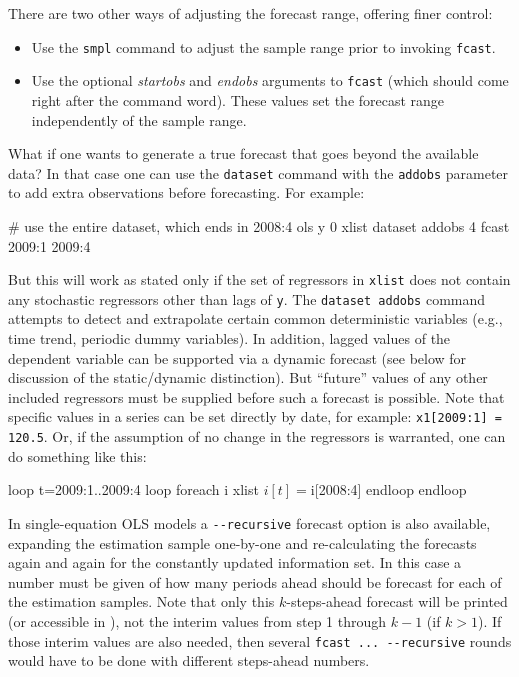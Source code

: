 There are two other ways of adjusting the forecast range, offering
finer control:
%
\begin{itemize}
\item Use the \texttt{smpl} command to adjust the sample range
  prior to invoking \texttt{fcast}.
\item Use the optional \textsl{startobs} and \textsl{endobs} arguments
  to \texttt{fcast} (which should come right after the command word).
  These values set the forecast range independently of the
  sample range.
\end{itemize}

What if one wants to generate a true forecast that goes beyond the
available data?  In that case one can use the \texttt{dataset} command
with the \texttt{addobs} parameter to add extra observations before 
forecasting.  For example:
%
\begin{code}
# use the entire dataset, which ends in 2008:4
ols y 0 xlist
dataset addobs 4
fcast 2009:1 2009:4
\end{code}
%
But this will work as stated only if the set of regressors in
\texttt{xlist} does not contain any stochastic regressors other than
lags of \texttt{y}.  The \texttt{dataset addobs} command attempts to detect
and extrapolate certain common deterministic variables (e.g., time
trend, periodic dummy variables).  In addition, lagged values of the
dependent variable can be supported via a dynamic forecast (see below
for discussion of the static/dynamic distinction).  But ``future''
values of any other included regressors must be supplied before such a
forecast is possible.  Note that specific values in a series can be
set directly by date, for example: \texttt{x1[2009:1] = 120.5}.  Or,
if the assumption of no change in the regressors is warranted, one can
do something like this:
%
\begin{code}
loop t=2009:1..2009:4
    loop foreach i xlist
        $i[t] = $i[2008:4]
    endloop
endloop
\end{code}

In single-equation OLS models a \verb|--recursive| forecast option is
also available, expanding the estimation sample one-by-one and 
re-calculating the forecasts again and again for the constantly updated
information set. In this case a number must be given of how many periods
ahead should be forecast for each of the estimation samples. Note that
only this $k$-steps-ahead forecast will be printed (or accessible in 
), not the interim values from step 1 through $k-1$ (if 
$k>1$). If those interim values are also needed, then several 
\verb|fcast ... --recursive| rounds would have to be done with different
steps-ahead numbers.


